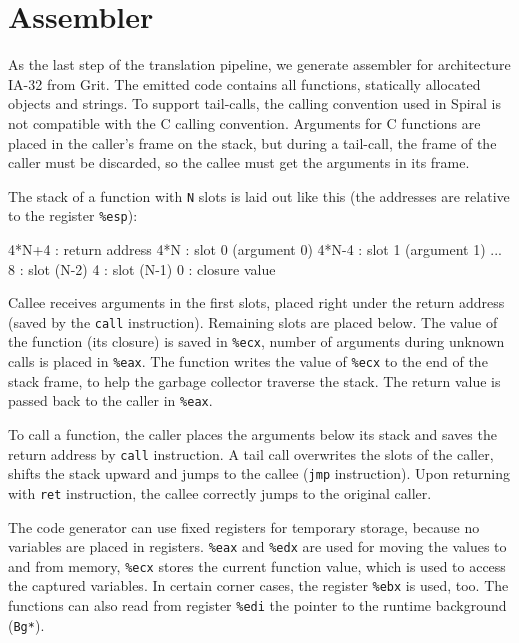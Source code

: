 \section{Assembler}

As the last step of the translation pipeline, we generate assembler for
architecture IA-32 from Grit. The emitted code contains all functions,
statically allocated objects and strings. To support tail-calls, the calling
convention used in Spiral is not compatible with the C calling convention.
Arguments for C functions are placed in the caller's frame on the stack, but
during a tail-call, the frame of the caller must be discarded, so the callee
must get the arguments in its frame.

The stack of a function with \texttt{N} slots is laid out like this (the
addresses are relative to the register \texttt{\%esp}):

\begin{ttcode}
  4*N+4  :  return address
    4*N  :  slot 0 (argument 0)
  4*N-4  :  slot 1 (argument 1)
            ...
      8  :  slot (N-2)
      4  :  slot (N-1)
      0  :  closure value
\end{ttcode}

Callee receives arguments in the first slots, placed right under the return
address (saved by the \texttt{call} instruction). Remaining slots are placed
below. The value of the function (its closure) is saved in \texttt{\%ecx},
number of arguments during unknown calls is placed in \texttt{\%eax}. The
function writes the value of \texttt{\%ecx} to the end of the stack frame, to
help the garbage collector traverse the stack. The return value is passed back
to the caller in \texttt{\%eax}.

To call a function, the caller places the arguments below its stack and saves
the return address by \texttt{call} instruction. A tail call overwrites the
slots of the caller, shifts the stack upward and jumps to the callee
(\texttt{jmp} instruction). Upon returning with \texttt{ret} instruction, the
callee correctly jumps to the original caller.

The code generator can use fixed registers for temporary storage, because no
variables are placed in registers. \texttt{\%eax} and \texttt{\%edx} are used
for moving the values to and from memory, \texttt{\%ecx} stores the current
function value, which is used to access the captured variables. In certain
corner cases, the register \texttt{\%ebx} is used, too. The functions can also
read from register \texttt{\%edi} the pointer to the runtime background
(\texttt{Bg*}).
